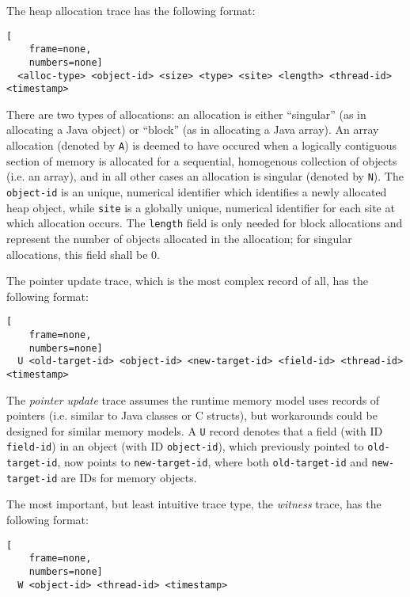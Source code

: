 The heap allocation trace has the following format:

\begin{lstlisting}[
    frame=none,
    numbers=none]
  <alloc-type> <object-id> <size> <type> <site> <length> <thread-id> <timestamp>
\end{lstlisting}

There are two types of allocations: an allocation is either ``singular'' (as in allocating a Java object) or ``block'' (as in
allocating a Java array). An array allocation (denoted by \lstinline{A}) is deemed to have occured when a logically contiguous
section of memory is allocated for a sequential, homogenous collection of objects (i.e. an array), and in all other cases an allocation is
singular (denoted by \lstinline{N}). The \lstinline{object-id} is an unique, numerical identifier which identifies a newly allocated
heap object, while \lstinline{site} is a globally unique, numerical identifier for each site at which allocation occurs. The
\lstinline{length} field is only needed for block allocations and represent the number of objects allocated in the allocation; for
singular allocations, this field shall be 0.

The pointer update trace, which is the most complex record of all, has the following format:

\begin{lstlisting}[
    frame=none,
    numbers=none]
  U <old-target-id> <object-id> <new-target-id> <field-id> <thread-id> <timestamp>
\end{lstlisting}

The \emph{pointer update} trace assumes the runtime memory model uses records of pointers (i.e. similar to Java classes or C structs), but
workarounds could be designed for similar memory models. A \lstinline{U} record denotes that a field (with ID \lstinline{field-id}) in an
object (with ID \lstinline{object-id}), which previously pointed to \lstinline{old-target-id}, now points to \lstinline{new-target-id}, where
both \lstinline{old-target-id} and \lstinline{new-target-id} are IDs for memory objects.

The most important, but least intuitive trace type, the \emph{witness} trace, has the following format:

\begin{lstlisting}[
    frame=none,
    numbers=none]
  W <object-id> <thread-id> <timestamp>
\end{lstlisting}

